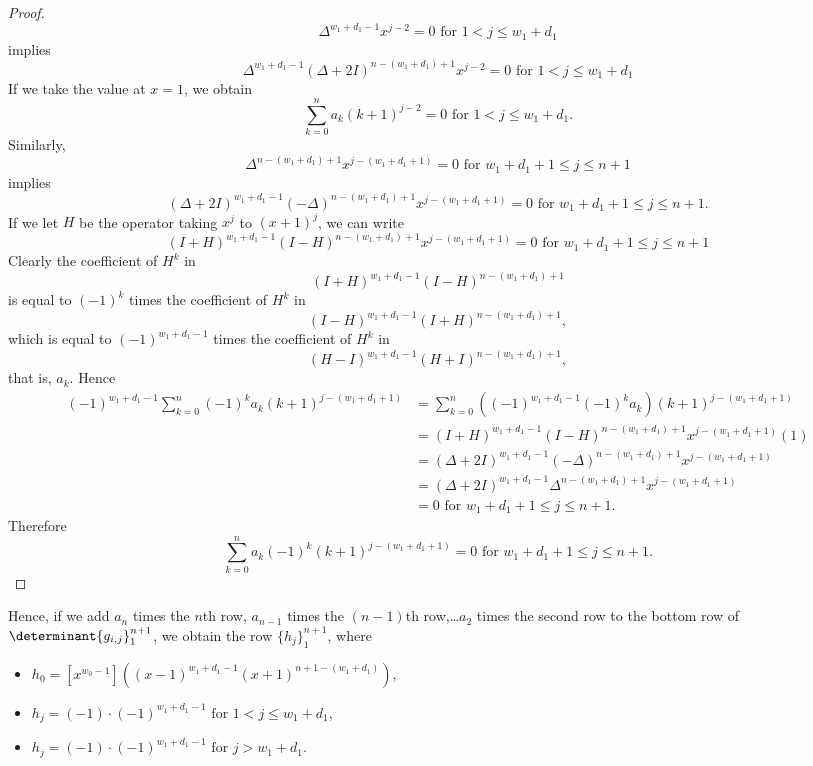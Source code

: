 \documentclass[10pt,reqno]{amsart}
\theoremstyle{plain}
\theoremstyle{definition}
\theoremstyle{remark}
\begin{document}
\begin{proof}
\begin{equation}
\Delta^{w_1+d_1-1} x^{j-2} = 0  \text{ for } 1<j\leq w_1+d_1
\end{equation}
implies
\begin{equation}\Delta^{w_1+d_1-1} (\Delta + 2I)^{n-(w_1+d_1)+1} x^{j-2} = 0
\text{ for } 1<j\leq w_1+d_1\end{equation}
If we take the value at $x=1$, we obtain
\begin{equation} \sum_{k=0}^n a_k (k+1)^{j-2} = 0  \text{ for } 1<j\leq w_1+d_1.\end{equation}
Similarly,
\begin{equation}
\Delta^{n-(w_1+d_1)+1} x^{j-(w_1+d_1+1)} = 0 \text{ for } 
w_1+d_1+1\leq j\leq n+1
\end{equation}
implies
\begin{equation}
(\Delta + 2I)^{w_1+d_1-1} (-\Delta)^{n-(w_1+d_1)+1} x^{j-(w_1+d_1+1)} = 0
\text{ for } 
w_1+d_1+1\leq j\leq n+1.
\end{equation}
If we let $H$ be the operator taking $x^j$ to $(x+1)^j$, we can write
\begin{equation}\label{eq:blofeld}
(I+H)^{w_1+d_1-1} (I-H)^{n-(w_1+d_1)+1} x^{j-(w_1+d_1+1)} = 0
\text{ for } 
w_1+d_1+1\leq j\leq n+1
\end{equation}
Clearly the coefficient of
$H^k$ in \[(I+H)^{w_1+d_1-1} (I-H)^{n-(w_1+d_1)+1}\] is equal
to $(-1)^k$ times the coefficient of $H^k$ in 
\[(I-H)^{w_1+d_1-1} (I+H)^{n-(w_1+d_1)+1},\] which is equal to
$(-1)^{w_1+d_1-1}$ times the coefficient of
$H^k$ in 
\[(H-I)^{w_1+d_1-1} (H+I)^{n-(w_1+d_1)+1},\]
that is, $a_k$. Hence
\[ \begin{aligned}
(-1)^{w_1+d_1-1} \sum_{k=0}^n (-1)^k a_k (k+1)^{j-(w_1+d_1+1)} &=
\sum_{k=0}^n ((-1)^{w_1+d_1-1} (-1)^k a_k) (k+1)^{j-(w_1+d_1+1)} \\ &=
(I+H)^{w_1+d_1-1} (I-H)^{n-(w_1+d_1)+1} x^{j-(w_1+d_1+1)}(1) \\ &=
(\Delta + 2I)^{w_1+d_1-1} (-\Delta)^{n-(w_1+d_1)+1} 
  x^{j-(w_1+d_1+1)} \\ &=
(\Delta + 2I)^{w_1+d_1-1} \Delta^{n-(w_1+d_1)+1} 
  x^{j-(w_1+d_1+1)} \\ &= 0
\text{ for } 
w_1+d_1+1\leq j\leq n+1.
\end{aligned}
\]
Therefore
\[
\sum_{k=0}^n a_k (-1)^k (k+1)^{j-(w_1+d_1+1)} = 0 \text{ for } 
w_1+d_1+1\leq j\leq n+1.
\]
\end{proof}

Hence, if we add $a_n$ times the $n$th row, $a_{n-1}$ times the
$(n-1)$th row,\dots $a_2$ times the second row to 
the bottom row of $\determinant{g_{i,j}}_1^{n+1}$, we obtain
the row $\{h_j\}_1^{n+1}$, where 
\begin{itemize}
\item $h_0=[x^{w_0-1}]((x-1)^{w_1+d_1-1} (x+1)^{n+1-(w_1+d_1)})$,
\item $h_j = (-1)\cdot (-1)^{w_1+d_1-1} \text{ for } 1<j\leq w_1+d_1$,
\item $h_j = (-1)\cdot (-1)^{w_1+d_1-1} \text{ for } j> w_1+d_1$.
\end{itemize}
\end{document}
